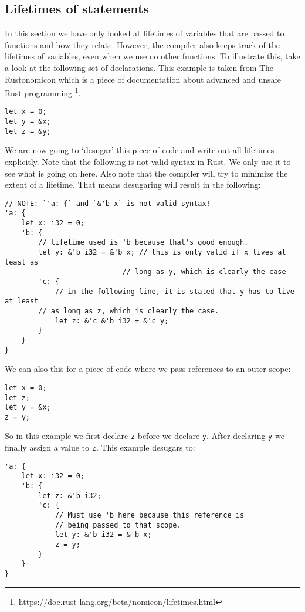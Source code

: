 \subsection{Lifetimes of statements}\label{desugar}
In this section we have only looked at lifetimes of variables that are passed to functions and how they relate. However, the compiler also keeps track of the lifetimes of variables, even when we use no other functions. To illustrate this, take a look at the following set of declarations. This example is taken from The Rustonomicon which is a piece of documentation about advanced and unsafe Rust programming \footnote{https://doc.rust-lang.org/beta/nomicon/lifetimes.html}.

\begin{verbatim}
let x = 0;
let y = &x;
let z = &y;
\end{verbatim}

We are now going to `desugar' this piece of code and write out all lifetimes explicitly. Note that the following is not valid syntax in Rust. We only use it to see what is going on here. Also note that the compiler will try to minimize the extent of a lifetime. That means desugaring will result in the following: 

\begin{verbatim}
// NOTE: `'a: {` and `&'b x` is not valid syntax!
'a: {
    let x: i32 = 0;
    'b: {
        // lifetime used is 'b because that's good enough.
        let y: &'b i32 = &'b x; // this is only valid if x lives at least as 
                            // long as y, which is clearly the case
        'c: {
            // in the following line, it is stated that y has to live at least
        // as long as z, which is clearly the case. 
            let z: &'c &'b i32 = &'c y;
        }
    }
}
\end{verbatim}

We can also this for a piece of code where we pass references to an outer scope:

\begin{verbatim}
let x = 0;
let z;
let y = &x;
z = y;
\end{verbatim}

So in this example we first declare \verb|z| before we declare \verb|y|. After declaring \verb|y| we finally assign a value to \verb|z|. This example desugars to:

\begin{verbatim}
'a: {
    let x: i32 = 0;
    'b: {
        let z: &'b i32;
        'c: {
            // Must use 'b here because this reference is
            // being passed to that scope.
            let y: &'b i32 = &'b x;
            z = y;
        }
    }
}
\end{verbatim}

